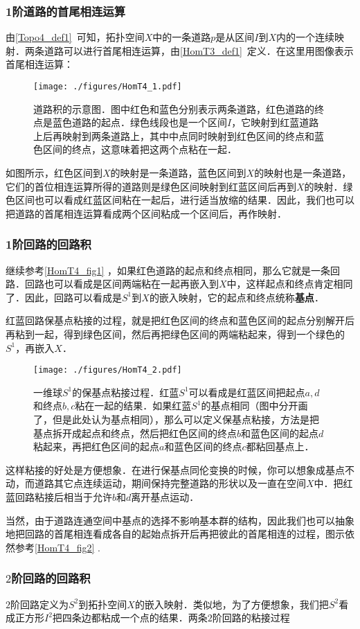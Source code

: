 \subsubsection{1阶道路的首尾相连运算}

由\autoref{Topo4_def1}~可知，拓扑空间$X$中的一条道路$p$是从区间$I$到$X$内的一个连续映射．两条道路可以进行首尾相连运算，由\autoref{HomT3_def1}~定义．在这里用图像表示首尾相连运算：


\begin{figure}[ht]
\centering
\texttt{[image: ./figures/HomT4\_1.pdf]}
\caption{道路积的示意图．图中红色和蓝色分别表示两条道路，红色道路的终点是蓝色道路的起点．绿色线段也是一个区间$I$，它映射到红蓝道路上后再映射到两条道路上，其中中点同时映射到红色区间的终点和蓝色区间的终点，这意味着把这两个点粘在一起．} \label{HomT4_fig1}
\end{figure}

如图所示，红色区间到$X$的映射是一条道路，蓝色区间到$X$的映射也是一条道路，它们的首位相连运算所得的道路则是绿色区间映射到红蓝区间后再到$X$的映射．绿色区间也可以看成红蓝区间粘在一起后，进行适当放缩的结果．因此，我们也可以把道路的首尾相连运算看成两个区间粘成一个区间后，再作映射．

\subsubsection{1阶回路的回路积}

继续参考\autoref{HomT4_fig1} ，如果红色道路的起点和终点相同，那么它就是一条回路．回路也可以看成是区间两端粘在一起再嵌入到$X$中，这样起点和终点肯定相同了．因此，回路可以看成是$S^1$到$X$的嵌入映射，它的起点和终点统称\textbf{基点}．

红蓝回路保基点粘接的过程，就是把红色区间的终点和蓝色区间的起点分别解开后再粘到一起，得到绿色区间，然后再把绿色区间的两端粘起来，得到一个绿色的$S^1$，再嵌入$X$．

\begin{figure}[ht]
\centering
\texttt{[image: ./figures/HomT4\_2.pdf]}
\caption{一维球$S^1$的保基点粘接过程．红蓝$S^1$可以看成是红蓝区间把起点$a, d$和终点$b, c$粘在一起的结果．如果红蓝$S^1$的基点相同（图中分开画了，但是此处认为基点相同），那么可以定义保基点粘接，方法是把基点拆开成起点和终点，然后把红色区间的终点$b$和蓝色区间的起点$d$粘起来，再把红色区间的起点$a$和蓝色区间的终点$c$都粘回基点上．} \label{HomT4_fig2}
\end{figure}

这样粘接的好处是方便想象．在进行保基点同伦变换的时候，你可以想象成基点不动，而道路其它点连续运动，期间保持完整道路的形状以及一直在空间$X$中．把红蓝回路粘接后相当于允许$b$和$d$离开基点运动．

当然，由于道路连通空间中基点的选择不影响基本群的结构，因此我们也可以抽象地把回路的首尾相连看成各自的起始点拆开后再把彼此的首尾相连的过程，图示依然参考\autoref{HomT4_fig2} .

\subsubsection{$2$阶回路的回路积}

$2$阶回路定义为$S^2$到拓扑空间$X$的嵌入映射．类似地，为了方便想象，我们把$S^2$看成正方形$I^2$把四条边都粘成一个点的结果．两条$2$阶回路的粘接过程


